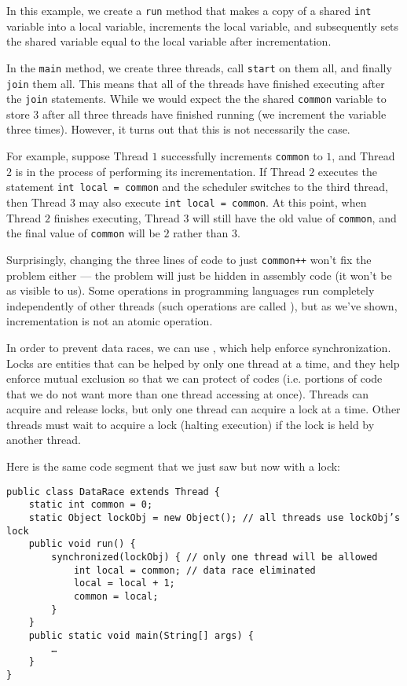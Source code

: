 In this example, we create a \verb!run! method that makes a copy of a shared \verb!int! variable into a local variable, increments the local variable, and subsequently sets the shared variable equal to the local variable after incrementation. 

In the \verb!main! method, we create three threads, call \verb!start! on them all, and finally \verb!join! them all. This means that all of the threads have finished executing after the \verb!join! statements. While we would expect the the shared \verb!common! variable to store $3$ after all three threads have finished running (we increment the variable three times). However, it turns out that this is not necessarily the case. 

For example, suppose Thread $1$ successfully increments \verb!common! to $1$, and Thread $2$ is in the process of performing its incrementation. If Thread $2$ executes the statement \verb!int local = common! and the scheduler switches to the third thread, then Thread $3$ may also execute \verb!int local = common!. At this point, when Thread $2$ finishes executing, Thread $3$ will still have the old value of \verb!common!, and the final value of \verb!common! will be $2$ rather than $3$. 

Surprisingly, changing the three lines of code to just \verb!common++! won't fix the problem either --- the problem will just be hidden in assembly code (it won't be as visible to us). Some operations in programming languages run completely independently of other threads (such operations are called ), but as we've shown, incrementation is not an atomic operation. 

In order to prevent data races, we can use , which help enforce synchronization. Locks are entities that can be helped by only one thread at a time, and they help enforce mutual exclusion so that we can protect  of codes (i.e. portions of code that we do not want more than one thread accessing at once). Threads can acquire and release locks, but only one thread can acquire a lock at a time. Other threads must wait to acquire a lock (halting execution) if the lock is held by another thread.

Here is the same code segment that we just saw but now with a lock:

\begin{lstlisting}
public class DataRace extends Thread {
    static int common = 0;
    static Object lockObj = new Object(); // all threads use lockObj’s lock
    public void run() {
        synchronized(lockObj) { // only one thread will be allowed
            int local = common; // data race eliminated
            local = local + 1;
            common = local;
        }
    }
    public static void main(String[] args) {
        …
    }
}
\end{lstlisting}

